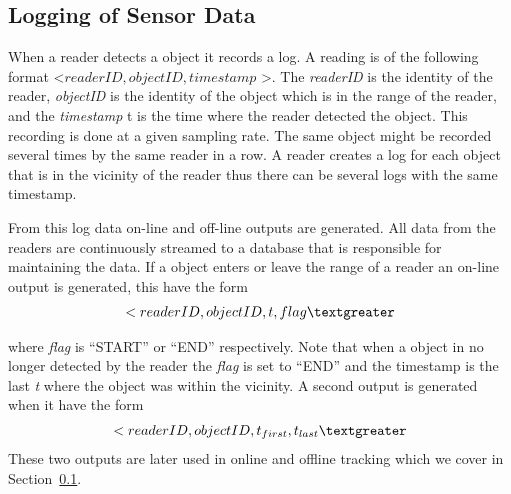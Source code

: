\subsection{Logging of Sensor Data}
When a reader detects a object it records a log. 
A reading is of the following format \textless $readerID,objectID,timestamp$ \textgreater.
The \textit{readerID} is the identity of the reader, \textit{objectID} is the identity of the object which is in the range of the reader, and the \textit{timestamp} t is the time where the reader detected the object.
This recording is done at a given sampling rate. 
The same object might be recorded several times by the same reader in a row. 
A reader creates a log for each object that is in the vicinity of the reader thus there can be several logs with the same timestamp.

From this log data on-line and off-line outputs are generated.
All data from the readers are continuously streamed to a database that is responsible for maintaining the data.
If a object enters or leave the range of a reader an on-line output is generated, this have the form
\begin{align}
\textless readerID,objectID,t,flag \textgreater 
\end{align}

where \textit{flag} is "`START"' or "`END"' respectively. 
Note that when a object in no longer detected by the reader  the \textit{flag} is set to "`END"' and the timestamp is the last \textit{t} where the object was within the vicinity.
A second output is generated when it have the form 
\begin{align}
\textless\textit{$readerID,objectID,t_{first},t_{last}$}\textgreater
\end{align}
These two outputs are later used in online and offline tracking which we cover in Section~\ref{}.

 
